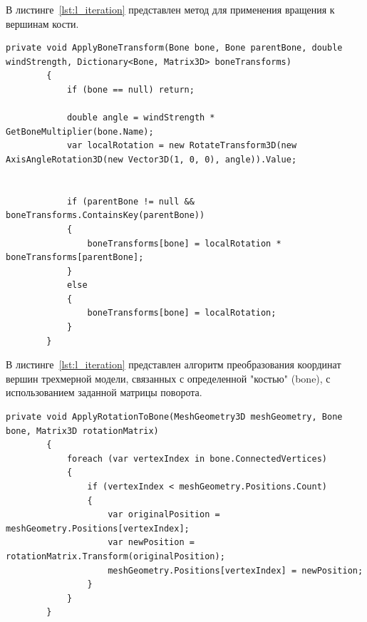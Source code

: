 В листинге~\ref{lst:l_iteration} представлен метод для применения вращения к вершинам кости.
\begin{center}
\begin{lstlisting}[caption={Метод для применения вращения к вершинам кости}, label={lst:l_iteration}]
private void ApplyBoneTransform(Bone bone, Bone parentBone, double windStrength, Dictionary<Bone, Matrix3D> boneTransforms)
        {
            if (bone == null) return;

            double angle = windStrength * GetBoneMultiplier(bone.Name);
            var localRotation = new RotateTransform3D(new AxisAngleRotation3D(new Vector3D(1, 0, 0), angle)).Value;

            
            if (parentBone != null && boneTransforms.ContainsKey(parentBone))
            {
                boneTransforms[bone] = localRotation * boneTransforms[parentBone];
            }
            else
            {
                boneTransforms[bone] = localRotation;
            }
        }
\end{lstlisting}
\end{center}

В листинге~\ref{lst:l_iteration} представлен алгоритм преобразования координат вершин трехмерной модели, связанных с определенной "костью" (bone), с использованием заданной матрицы поворота.
\begin{center}
\begin{lstlisting}[caption={Алгоритм преобразования координат вершин модели}, label={lst:l_iteration}]
private void ApplyRotationToBone(MeshGeometry3D meshGeometry, Bone bone, Matrix3D rotationMatrix)
        {
            foreach (var vertexIndex in bone.ConnectedVertices)
            {
                if (vertexIndex < meshGeometry.Positions.Count)
                {
                    var originalPosition = meshGeometry.Positions[vertexIndex];
                    var newPosition = rotationMatrix.Transform(originalPosition);
                    meshGeometry.Positions[vertexIndex] = newPosition;
                }
            }
        }
\end{lstlisting}
\end{center}



